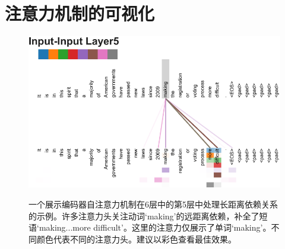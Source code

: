 \documentclass[lang=cn,a4paper,newtx]{elegantpaper}
\begin{document}
\section*{注意力机制的可视化}\label{sec:viz-att}
\begin{figure}[h]
{\includegraphics[width=\textwidth, trim=0 0 0 36, clip]{./vis/making_more_difficult5_new.pdf}}
\caption{一个展示编码器自注意力机制在6层中的第5层中处理长距离依赖关系的示例。许多注意力头关注动词`making'的远距离依赖，补全了短语`making...more difficult'。这里的注意力仅展示了单词`making'。不同颜色代表不同的注意力头。建议以彩色查看最佳效果。}
\end{figure}
\end{document}
